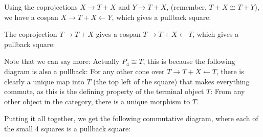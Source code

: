 \documentclass{article}
\begin{document}
\begin{center}\end{center}

Using the coprojections $X \to T+X$ and $Y \to T+X$, (remember, $T+X \cong T+Y$), we have a cospan $X \rightarrow T+X \leftarrow Y$, which gives a pullback square:

\begin{center}\end{center}

The coprojection $T \to T+X$  gives a cospan $T \rightarrow T+X \leftarrow T$, which gives a pullback square:

\begin{center}\end{center}

Note that we can say more: Actually $P_4 \cong T$, this is because the following diagram is also a pullback: For any other cone over $T \rightarrow T+X \leftarrow T$, there is clearly a unique map into $T$ (the top left of the square) that makes everything commute, as this is the defining property of the terminal object $T$: From any other object in the category, there is a unique morphism to $T$.

\begin{center}\end{center}

Putting it all together, we  get the following commutative diagram, where each of the small 4 squares is a pullback square:


\begin{center}\end{center}
\end{document}
